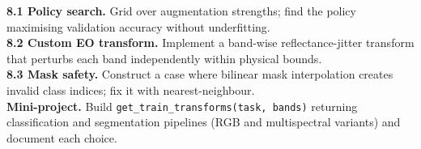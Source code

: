 \begin{exbox}
\textbf{8.1 Policy search.} Grid over augmentation strengths; find the policy
maximising validation accuracy without underfitting.\\[2pt]
\textbf{8.2 Custom EO transform.} Implement a band-wise reflectance-jitter
transform that perturbs each band independently within physical bounds.\\[2pt]
\textbf{8.3 Mask safety.} Construct a case where bilinear mask interpolation
creates invalid class indices; fix it with nearest-neighbour.\\[2pt]
\textbf{Mini-project.} Build \texttt{get\_train\_transforms(task, bands)} returning
classification and segmentation pipelines (RGB and multispectral variants) and
document each choice.
\end{exbox}

